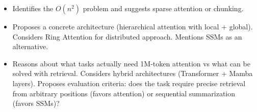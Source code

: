 \begin{interviewq}

\goodgreat
\begin{itemize}
    \item {} Identifies the $O(n^2)$ problem and suggests sparse attention or chunking.
    \item {} Proposes a concrete architecture (hierarchical attention with local + global). Considers Ring Attention for distributed approach. Mentions SSMs as an alternative.
    \item {} Reasons about what tasks actually need 1M-token attention vs what can be solved with retrieval. Considers hybrid architectures (Transformer + Mamba layers). Proposes evaluation criteria: does the task require precise retrieval from arbitrary positions (favors attention) or sequential summarization (favors SSMs)?
\end{itemize}

\end{interviewq}


